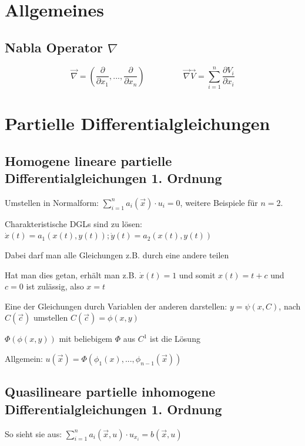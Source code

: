 \documentclass[10pt,a4paper]{article}
\newenvironment{packed_enum}{
\begin{enumerate}
  \setlength{\itemsep}{1pt}
  \setlength{\parskip}{0pt}
  \setlength{\parsep}{0pt}
}{\end{enumerate}}
\begin{document}
\section{Allgemeines}
\subsection{Nabla Operator $\nabla$}
\[
\vec{\nabla} = \left(\frac{\partial}{\partial x_1}, ..., \frac{\partial}{\partial x_n} \right)
\,\,\,\,\,\,\,\,\,\,\,\,\,\,\,\,\,\,\,\,\,\,\,\,\,\,\,\,
\vec{\nabla} \vec{V} = \sum\limits_{i=1}^n \frac{\partial V_i}{\partial x_i}
\]

\section{Partielle Differentialgleichungen}
\subsection{Homogene lineare partielle Differentialgleichungen 1. Ordnung}
\begin{packed_enum}
\item Umstellen in Normalform: $\sum\limits_{i = 1}^n a_i(\vec{x}) \cdot u_i = 0$, weitere Beispiele für $n=2$.
\item Charakteristische DGLs sind zu lösen: $\dot{x}(t) = a_1(x(t), y(t)); \dot{y}(t) = a_2(x(t), y(t))$
\begin{packed_enum}
\item Dabei darf man alle Gleichungen z.B. durch eine andere teilen
\item Hat man dies getan, erhält man z.B. $\dot{x}(t)=1$ und somit $x(t)=t+c$ und $c=0$ ist zulässig, also $x=t$
\end{packed_enum}
\item Eine der Gleichungen durch Variablen der anderen darstellen: $y = \psi(x, C)$, nach $C(\vec{c})$ umstellen $C(\vec{c}) = \phi(x,y)$
\item $\Phi(\phi(x,y))$ mit beliebigem $\Phi$ aus $C^1$ ist die Lösung
\item Allgemein: $u(\vec{x}) = \Phi(\phi_1({x}), ... , \phi_{n-1}(\vec{x}))$
\end{packed_enum}

\subsection{Quasilineare partielle inhomogene Differentialgleichungen 1. Ordnung}
So sieht sie aus: $\sum\limits_{i=1}^n a_i(\vec{x}, u)\cdot u_{x_i} = b(\vec{x}, u)$
\end{document}

